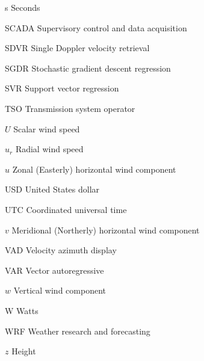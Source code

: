 \begin{abbreviations}
\item[s] Seconds
\item[SCADA] Supervisory control and data acquisition
\item[SDVR] Single Doppler velocity retrieval
\item[SGDR] Stochastic gradient descent regression
\item[SVR] Support vector regression

\item[TSO] Transmission system operator

\item[$U$] Scalar wind speed
\item[$u_r$] Radial wind speed
\item[$u$] Zonal (Easterly) horizontal wind component
\item[USD] United States dollar
\item[UTC] Coordinated universal time

\item[$v$] Meridional (Northerly) horizontal wind component
\item[VAD] Velocity azimuth display
\item[VAR] Vector autoregressive

\item[$w$] Vertical wind component
\item[W] Watts
\item[WRF] Weather research and forecasting

\item[$z$] Height

\end{abbreviations} 
